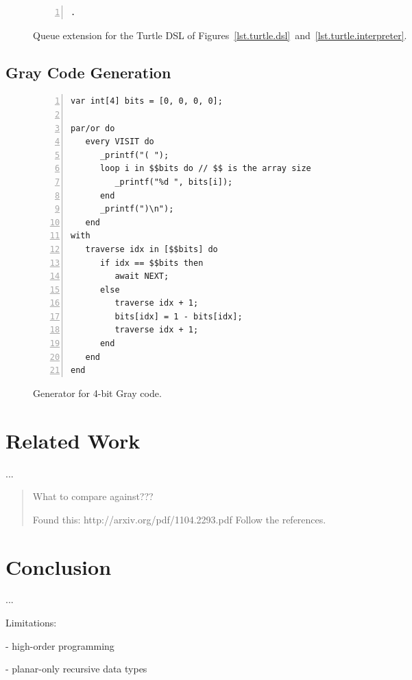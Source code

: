 \documentclass{acm_proc_article-sp}
\begin{document}
\begin{figure*}
\begin{minipage}[t]{0.38\linewidth}
\begin{lstlisting}[numbers=left,xleftmargin=3.5em,title=CODE-3: Command enqueuing]
.
\end{lstlisting}
\end{minipage}
%
\caption{ Queue extension for the Turtle DSL of
          Figures~\ref{lst.turtle.dsl}~and~\ref{lst.turtle.interpreter}.
\label{lst.turtle.queue}
}
\end{figure*}

\subsection{Gray Code Generation}

\begin{figure}%
\begin{lstlisting}[numbers=left,xleftmargin=3em]
var int[4] bits = [0, 0, 0, 0];

par/or do
   every VISIT do
      _printf("( ");
      loop i in $$bits do // $$ is the array size
         _printf("%d ", bits[i]);
      end
      _printf(")\n");
   end
with
   traverse idx in [$$bits] do
      if idx == $$bits then
         await NEXT;
      else
         traverse idx + 1;
         bits[idx] = 1 - bits[idx];
         traverse idx + 1;
      end
   end
end
\end{lstlisting}
\caption{ Generator for 4-bit Gray code.
\label{lst.gray}
}
\end{figure}



\section{Related Work}

...

\begin{quotation}
What to compare against???

Found this: http://arxiv.org/pdf/1104.2293.pdf
Follow the references.
\end{quotation}

\section{Conclusion}

...

Limitations:

- high-order programming

- planar-only recursive data types



\balancecolumns
\end{document}

